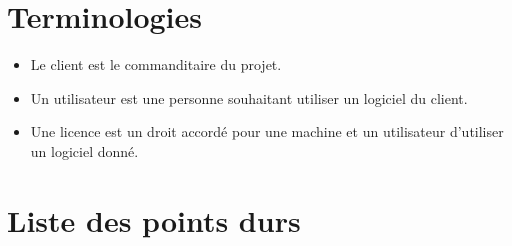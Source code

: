 \chapter{Terminologies}

\begin{itemize}
	\item Le client est le commanditaire du projet.
	\item Un utilisateur est une personne souhaitant utiliser un logiciel du client. 
	\item Une licence est un droit accordé pour une machine et un utilisateur d'utiliser un logiciel donné.
\end{itemize}

\chapter{Liste des points durs}

